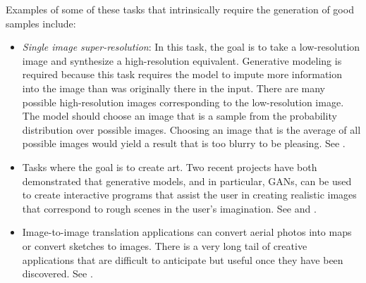 Examples of some of these tasks that intrinsically require the generation of good
samples include:
\begin{itemize}
  \item {\em Single image super-resolution}: In this task, the goal is to take a
    low-resolution image and synthesize a high-resolution equivalent.
    Generative modeling is required because this task requires the model to impute
    more information into the image than was originally there in the input.
    There are many possible high-resolution images corresponding to the low-resolution
    image.
    The model should choose an image that is a sample from the probability distribution
    over possible images.
    Choosing an image that is the average of all possible images would yield a result
    that is too blurry to be pleasing.
    See .

  \item Tasks where the goal is to create art.
    Two recent projects have both demonstrated that generative models, and in particular,
    GANs, can be used to create interactive programs that assist the user in creating
    realistic images that correspond to rough scenes in the user's imagination.
    See  and .

  \item Image-to-image translation applications can convert aerial photos into maps
    or convert sketches to images. There is a very long tail of creative applications
    that are difficult to anticipate but useful once they have been discovered.
    See .

\end{itemize}

